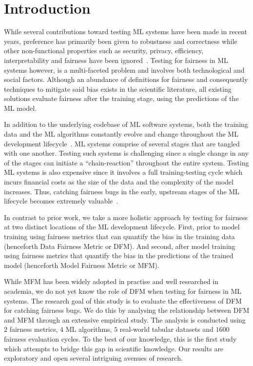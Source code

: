 \documentclass[sigconf,review,anonymous]{acmart}
\begin{document}
\section{Introduction}\label{sec:intro}

While several contributions toward testing ML systems have been made
in recent years, preference has primarily been given to robustness and
correctness while other non-functional properties such as security,
privacy, efficiency, interpretability and fairness have been
ignored \cite{zhang2020machine,zhang2021ignorance,mehrabi2021survey,wan2021modeling}. Testing
for fairness in ML systems however, is a multi-faceted problem and
involves both technological and social factors. Although an abundance
of definitions for fairness and consequently techniques to mitigate
said bias exists in the scientific literature, all existing solutions
evaluate fairness after the training stage, using the predictions of
the ML model.

In addition to the underlying codebase of ML software systems, both
the training data and the ML algorithms constantly evolve and change
throughout the ML development
lifecycle \cite{sculley2015hidden,bosch2021engineering,hutchinson2021towards}.
ML systems comprise of several stages that are tangled with one
another. Testing such systems is challenging since a single change in
any of the stages can initiate a ``chain-reaction'' throughout the
entire system. Testing ML systems is also expensive since it involves
a full training-testing cycle which incurs financial costs as the size
of the data and the complexity of the model increases. Thus, catching
fairness bugs in the early, upstream stages of the ML lifecycle
becomes extremely valuable \cite{shome2022data}.

In contrast to prior work, we take a more holistic approach by testing
for fairness at two distinct locations of the ML development
lifecycle. First, prior to model training using fairness metrics that
can quantify the bias in the training data (henceforth Data Fairness
Metric or DFM). And second, after model training using fairness
metrics that quantify the bias in the predictions of the trained model
(henceforth Model Fairness Metric or MFM).

While MFM has been widely adopted in practise and well researched in
academia, we do not yet know the role of DFM when testing for fairness
in ML systems. The research goal of this study is to evaluate the
effectiveness of DFM for catching fairness bugs. We do this by
analysing the relationship between DFM and MFM through an extensive
empirical study. The analysis is conducted using $2$ fairness metrics,
$4$ ML algorithms, $5$ real-world tabular datasets and $1600$ fairness
evaluation cycles. To the best of our knowledge, this is the first
study which attempts to bridge this gap in scientific knowledge. Our
results are exploratory and open several intriguing avenues of
research.
\end{document}
